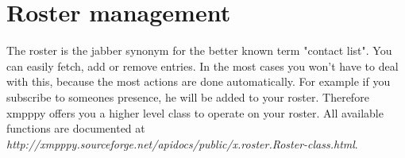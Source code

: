 \chapter{Roster management}

The roster is the jabber synonym for the better known term "contact list". You can easily fetch, add or remove entries.
In the most cases you won't have to deal with this, because the most actions are done automatically.
For example if you subscribe to someones presence, he will be added to your roster.
Therefore xmpppy offers you a higher level class to operate on your roster.
\newline
All available functions are documented at  \textit{http://xmpppy.sourceforge.net/apidocs/public/x.roster.Roster-class.html}.


